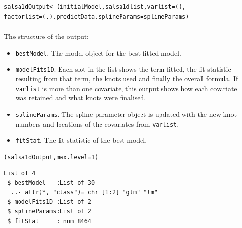 \begin{frame}[fragile]
\begin{knitrout}
\begin{kframe}
\begin{alltt}
\end{alltt}
\end{kframe}
\end{knitrout}

\begin{knitrout}\footnotesize
{}\color{fgcolor}\begin{kframe}
\begin{alltt}
salsa1dOutput <- (initialModel, salsa1dlist, varlist=(), 
    factorlist=(, ), predictData, splineParams=splineParams)
\end{alltt}
\end{kframe}
\end{knitrout}
\end{frame}

\begin{frame}[fragile]
\frametitle{}
\noindent The structure of the output: 
\begin{itemize}
\item {\tt bestModel}. The model object for the best fitted model.
\item {\tt modelFits1D}.  Each slot in the list shows the term fitted, the fit statistic resulting from that term, the knots used and finally the overall formula.  If {\tt varlist} is more than one covariate, this output shows how each covariate was retained and what knots were finalised.
\item {\tt splineParams}.  The spline parameter object is updated with the new knot numbers and locations of the covariates from {\tt varlist}.
\item {\tt fitStat}.  The fit statistic of the best model.
\end{itemize}

\begin{knitrout}\footnotesize
{}\color{fgcolor}\begin{kframe}
\begin{alltt}
(salsa1dOutput, max.level = 1)
\end{alltt}
\begin{verbatim}
List of 4
 $ bestModel   :List of 30
  ..- attr(*, "class")= chr [1:2] "glm" "lm"
 $ modelFits1D :List of 2
 $ splineParams:List of 2
 $ fitStat     : num 8464
\end{verbatim}
\end{kframe}
\end{knitrout}
\end{frame}

